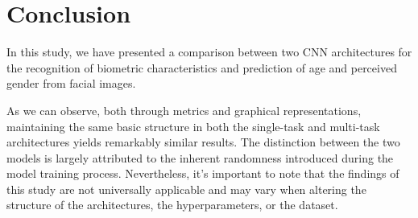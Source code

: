 \section{Conclusion} \label{sec:conclusions}
In this study, we have presented a comparison between two CNN
architectures for the recognition of biometric characteristics
and prediction of age and perceived gender from facial images.

As we can observe, both through metrics and graphical representations,
maintaining the same basic structure in both the single-task and multi-task
architectures yields remarkably similar results.
The distinction between the two models is largely attributed to the
inherent randomness introduced during the model training process.
Nevertheless, it's important to note that the findings of this study
are not universally applicable and may vary when altering the
structure of the architectures, the hyperparameters, or the dataset.